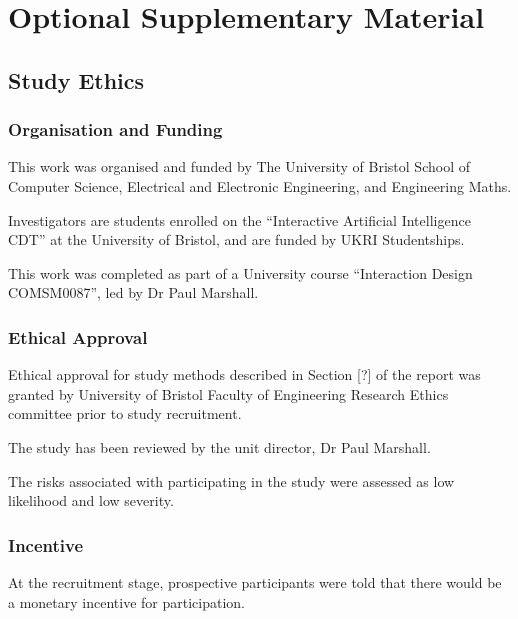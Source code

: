 \documentclass[manuscript,screen,review]{acmart}
\begin{document}
\appendix

\section{Optional Supplementary Material}

\subsection{Study Ethics}

\subsubsection{Organisation and Funding}


This work was organised and funded by The University of Bristol School of Computer Science, Electrical and Electronic Engineering, and Engineering Maths.

Investigators are students enrolled on the “Interactive Artificial Intelligence CDT” at the University of Bristol, and are funded by UKRI Studentships.

This work was completed as part of a University course “Interaction Design COMSM0087”, led by Dr Paul Marshall.


\subsubsection{Ethical Approval} 


Ethical approval for study methods described in Section [?] of the report was granted by University of Bristol Faculty of Engineering Research Ethics committee prior to study recruitment.

The study has been reviewed by the unit director, Dr Paul Marshall.

The risks associated with participating in the study were assessed as low likelihood and low severity. 

\subsubsection{Incentive}  


At the recruitment stage, prospective participants were told that there would be a monetary incentive for participation.
\end{document}
